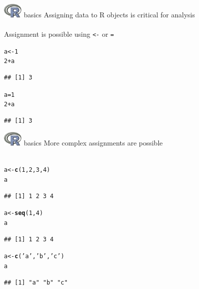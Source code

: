\documentclass[xcolor=svgnames]{beamer}\usepackage[]{graphicx}\usepackage[]{color}
\makeatletter
\newcommand{\hlnum}[1]{\textcolor[rgb]{0.686,0.059,0.569}{#1}}%
\newcommand{\hlstr}[1]{\textcolor[rgb]{0.192,0.494,0.8}{#1}}%
\newcommand{\hlopt}[1]{\textcolor[rgb]{0,0,0}{#1}}%
\newcommand{\hlstd}[1]{\textcolor[rgb]{0.345,0.345,0.345}{#1}}%
\newcommand{\hlkwb}[1]{\textcolor[rgb]{0.69,0.353,0.396}{#1}}%
\newcommand{\hlkwd}[1]{\textcolor[rgb]{0.737,0.353,0.396}{\textbf{#1}}}%
\newenvironment{kframe}{%
 \def\at@end@of@kframe{}%
 \ifinner\ifhmode%
  \def\at@end@of@kframe{\end{minipage}}%
  \begin{minipage}{\columnwidth}%
 \fi\fi%
 \def\FrameCommand##1{\hskip\@totalleftmargin \hskip-\fboxsep
 \colorbox{shadecolor}{##1}\hskip-\fboxsep
     \hskip-\linewidth \hskip-\@totalleftmargin \hskip\columnwidth}%
 \MakeFramed {\advance\hsize-\width
   \@totalleftmargin\z@ \linewidth\hsize
   \@setminipage}}%
 {\par\unskip\endMakeFramed%
 \at@end@of@kframe}
\newenvironment{knitrout}{}{} %
\makeatother
\begin{document}
\begin{frame}[t,fragile]{\includegraphics[width=0.07\textwidth]{Rlogo.jpg} \hspace{0.01in} basics}
Assigning data to R objects is critical for analysis\\~\\
Assignment is possible using \textit{\texttt{<-}} or \textit{\texttt{=}}
\begin{knitrout}
\color{fgcolor}\begin{kframe}
\begin{alltt}
\hlstd{a} \hlkwb{<-} \hlnum{1}
\hlnum{2} \hlopt{+} \hlstd{a}
\end{alltt}
\begin{verbatim}
## [1] 3
\end{verbatim}
\begin{alltt}
\hlstd{a} \hlkwb{=} \hlnum{1}
\hlnum{2} \hlopt{+} \hlstd{a}
\end{alltt}
\begin{verbatim}
## [1] 3
\end{verbatim}
\end{kframe}
\end{knitrout}
\end{frame}

\begin{frame}[t,fragile]{\includegraphics[width=0.07\textwidth]{Rlogo.jpg} \hspace{0.01in} basics}
More complex assignments are possible\\~\\
\begin{knitrout}
\color{fgcolor}\begin{kframe}
\begin{alltt}
\hlstd{a} \hlkwb{<-} \hlkwd{c}\hlstd{(}\hlnum{1}\hlstd{,} \hlnum{2}\hlstd{,} \hlnum{3} \hlstd{,} \hlnum{4}\hlstd{)}
\hlstd{a}
\end{alltt}
\begin{verbatim}
## [1] 1 2 3 4
\end{verbatim}
\begin{alltt}
\hlstd{a} \hlkwb{<-} \hlkwd{seq}\hlstd{(}\hlnum{1}\hlstd{,} \hlnum{4}\hlstd{)}
\hlstd{a}
\end{alltt}
\begin{verbatim}
## [1] 1 2 3 4
\end{verbatim}
\begin{alltt}
\hlstd{a} \hlkwb{<-} \hlkwd{c}\hlstd{(}\hlstr{'a'}\hlstd{,} \hlstr{'b'}\hlstd{,} \hlstr{'c'}\hlstd{)}
\hlstd{a}
\end{alltt}
\begin{verbatim}
## [1] "a" "b" "c"
\end{verbatim}
\end{kframe}
\end{knitrout}
\end{frame}
\end{document}
